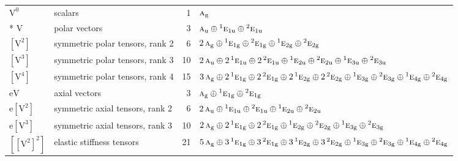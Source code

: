 \documentclass[10pt,a4paper]{article}
\numberwithin{equation}{section}
\newcommand{\irr}[1]{\text{\normalfont\scshape #1}}
\newcommand{\conjpair}[1]{{}^{#1}}
\newcommand{\ptag}[1]{\mathrm{#1}}
\newcommand{\jahn}[1]{\mathrm{#1}}
\newlength{\fillwidth}\newlength{\cellwidth}\newlength{\colwidth}
\begin{document}
{\begin{longtable}{@{}llr>{\RaggedRight\arraybackslash}p{\fillwidth}@{}}
\bottomrule\endfoot\endlastfoot
$\jahn{V^{0}}$ & scalars & 1 & $\irr{a}_{\ptag{g}}$\\*
$\jahn{V}$ & polar vectors & 3 & $\irr{a}_{\ptag{u}} \oplus\allowbreak \conjpair{1}\irr{e}_{1\ptag{u}} \oplus\allowbreak \conjpair{2}\irr{e}_{1\ptag{u}}$\\
$\jahn{[V^{2}]}$ & symmetric polar tensors, rank 2 & 6 & $2\,\irr{a}_{\ptag{g}} \oplus\allowbreak \conjpair{1}\irr{e}_{1\ptag{g}} \oplus\allowbreak \conjpair{2}\irr{e}_{1\ptag{g}} \oplus\allowbreak \conjpair{1}\irr{e}_{2\ptag{g}} \oplus\allowbreak \conjpair{2}\irr{e}_{2\ptag{g}}$\\
$\jahn{[V^{3}]}$ & symmetric polar tensors, rank 3 & 10 & $2\,\irr{a}_{\ptag{u}} \oplus\allowbreak 2\,\conjpair{1}\irr{e}_{1\ptag{u}} \oplus\allowbreak 2\,\conjpair{2}\irr{e}_{1\ptag{u}} \oplus\allowbreak \conjpair{1}\irr{e}_{2\ptag{u}} \oplus\allowbreak \conjpair{2}\irr{e}_{2\ptag{u}} \oplus\allowbreak \conjpair{1}\irr{e}_{3\ptag{u}} \oplus\allowbreak \conjpair{2}\irr{e}_{3\ptag{u}}$\\
$\jahn{[V^{4}]}$ & symmetric polar tensors, rank 4 & 15 & $3\,\irr{a}_{\ptag{g}} \oplus\allowbreak 2\,\conjpair{1}\irr{e}_{1\ptag{g}} \oplus\allowbreak 2\,\conjpair{2}\irr{e}_{1\ptag{g}} \oplus\allowbreak 2\,\conjpair{1}\irr{e}_{2\ptag{g}} \oplus\allowbreak 2\,\conjpair{2}\irr{e}_{2\ptag{g}} \oplus\allowbreak \conjpair{1}\irr{e}_{3\ptag{g}} \oplus\allowbreak \conjpair{2}\irr{e}_{3\ptag{g}} \oplus\allowbreak \conjpair{1}\irr{e}_{4\ptag{g}} \oplus\allowbreak \conjpair{2}\irr{e}_{4\ptag{g}}$\\
$\jahn{eV}$ & axial vectors & 3 & $\irr{a}_{\ptag{g}} \oplus\allowbreak \conjpair{1}\irr{e}_{1\ptag{g}} \oplus\allowbreak \conjpair{2}\irr{e}_{1\ptag{g}}$\\
$\jahn{e[V^{2}]}$ & symmetric axial tensors, rank 2 & 6 & $2\,\irr{a}_{\ptag{u}} \oplus\allowbreak \conjpair{1}\irr{e}_{1\ptag{u}} \oplus\allowbreak \conjpair{2}\irr{e}_{1\ptag{u}} \oplus\allowbreak \conjpair{1}\irr{e}_{2\ptag{u}} \oplus\allowbreak \conjpair{2}\irr{e}_{2\ptag{u}}$\\
$\jahn{e[V^{3}]}$ & symmetric axial tensors, rank 3 & 10 & $2\,\irr{a}_{\ptag{g}} \oplus\allowbreak 2\,\conjpair{1}\irr{e}_{1\ptag{g}} \oplus\allowbreak 2\,\conjpair{2}\irr{e}_{1\ptag{g}} \oplus\allowbreak \conjpair{1}\irr{e}_{2\ptag{g}} \oplus\allowbreak \conjpair{2}\irr{e}_{2\ptag{g}} \oplus\allowbreak \conjpair{1}\irr{e}_{3\ptag{g}} \oplus\allowbreak \conjpair{2}\irr{e}_{3\ptag{g}}$\\
$\jahn{[[V^{2}]^{2}]}$ & elastic stiffness tensors & 21 & $5\,\irr{a}_{\ptag{g}} \oplus\allowbreak 3\,\conjpair{1}\irr{e}_{1\ptag{g}} \oplus\allowbreak 3\,\conjpair{2}\irr{e}_{1\ptag{g}} \oplus\allowbreak 3\,\conjpair{1}\irr{e}_{2\ptag{g}} \oplus\allowbreak 3\,\conjpair{2}\irr{e}_{2\ptag{g}} \oplus\allowbreak \conjpair{1}\irr{e}_{3\ptag{g}} \oplus\allowbreak \conjpair{2}\irr{e}_{3\ptag{g}} \oplus\allowbreak \conjpair{1}\irr{e}_{4\ptag{g}} \oplus\allowbreak \conjpair{2}\irr{e}_{4\ptag{g}}$\\

\end{longtable}}
\end{document}
